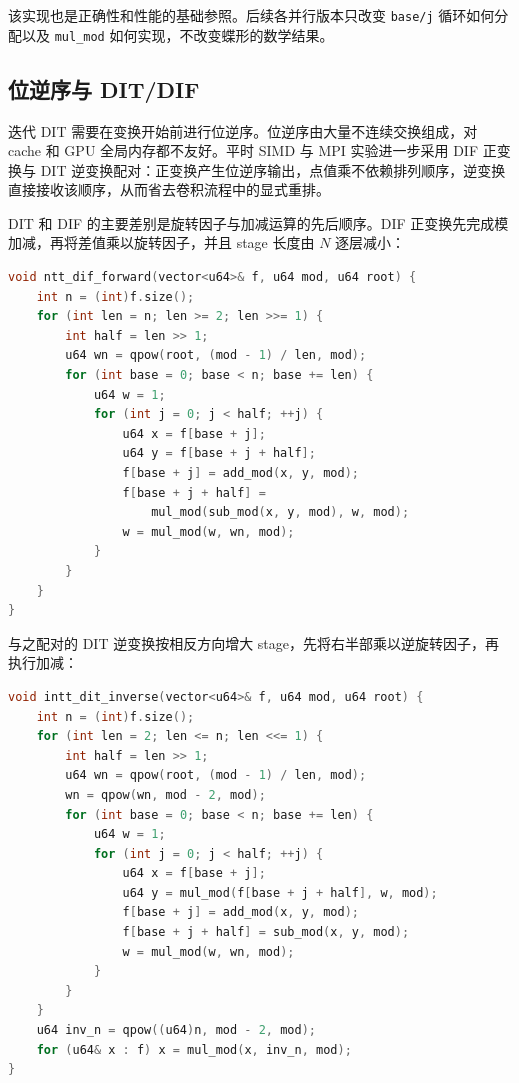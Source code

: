 该实现也是正确性和性能的基础参照。后续各并行版本只改变 \texttt{base/j} 循环如何分配以及 \texttt{mul\_mod} 如何实现，不改变蝶形的数学结果。

\subsection{位逆序与 DIT/DIF}

迭代 DIT 需要在变换开始前进行位逆序。位逆序由大量不连续交换组成，对 cache 和 GPU 全局内存都不友好。平时 SIMD 与 MPI 实验进一步采用 DIF 正变换与 DIT 逆变换配对：正变换产生位逆序输出，点值乘不依赖排列顺序，逆变换直接接收该顺序，从而省去卷积流程中的显式重排。

DIT 和 DIF 的主要差别是旋转因子与加减运算的先后顺序。DIF 正变换先完成模加减，再将差值乘以旋转因子，并且 stage 长度由 $N$ 逐层减小：

\begin{lstlisting}[title=DIF 正变换核心代码,label={lst:dif-forward},language={C++}]
void ntt_dif_forward(vector<u64>& f, u64 mod, u64 root) {
    int n = (int)f.size();
    for (int len = n; len >= 2; len >>= 1) {
        int half = len >> 1;
        u64 wn = qpow(root, (mod - 1) / len, mod);
        for (int base = 0; base < n; base += len) {
            u64 w = 1;
            for (int j = 0; j < half; ++j) {
                u64 x = f[base + j];
                u64 y = f[base + j + half];
                f[base + j] = add_mod(x, y, mod);
                f[base + j + half] =
                    mul_mod(sub_mod(x, y, mod), w, mod);
                w = mul_mod(w, wn, mod);
            }
        }
    }
}
\end{lstlisting}

与之配对的 DIT 逆变换按相反方向增大 stage，先将右半部乘以逆旋转因子，再执行加减：

\begin{lstlisting}[title=DIT 逆变换核心代码,label={lst:dit-inverse},language={C++}]
void intt_dit_inverse(vector<u64>& f, u64 mod, u64 root) {
    int n = (int)f.size();
    for (int len = 2; len <= n; len <<= 1) {
        int half = len >> 1;
        u64 wn = qpow(root, (mod - 1) / len, mod);
        wn = qpow(wn, mod - 2, mod);
        for (int base = 0; base < n; base += len) {
            u64 w = 1;
            for (int j = 0; j < half; ++j) {
                u64 x = f[base + j];
                u64 y = mul_mod(f[base + j + half], w, mod);
                f[base + j] = add_mod(x, y, mod);
                f[base + j + half] = sub_mod(x, y, mod);
                w = mul_mod(w, wn, mod);
            }
        }
    }
    u64 inv_n = qpow((u64)n, mod - 2, mod);
    for (u64& x : f) x = mul_mod(x, inv_n, mod);
}
\end{lstlisting}

